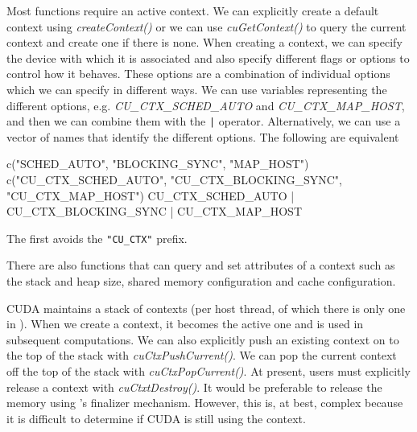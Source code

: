 \documentclass[article]{jss}
\def\R{\proglang{R}}
\def\Rpkg#1{\pkg{#1}}
\def\Rfunc#1{\textsl{#1()}}
\def\Rop#1{\texttt{#1}}
\def\Rvar#1{\textsl{#1}}
\begin{document}
Most \Rpkg{RCUDA} functions require an active context.  We can
explicitly create a default context using \Rfunc{createContext} or we
can use \Rfunc{cuGetContext} to query the current context and create
one if there is none.  When creating a context, we can specify the
device with which it is associated and also specify different flags or
options to control how it behaves.  These options are a combination of
individual options which we can specify in different ways. 
We can use \R{} variables representing the different options, e.g.
\Rvar{CU_CTX\_SCHED\_AUTO} and \Rvar{CU\_CTX\_MAP\_HOST},
and then we can combine them with the \Rop{|} operator. 
Alternatively, we can use a vector of names that identify the
different options. 
The following are equivalent
\begin{RCode}
c("SCHED_AUTO", "BLOCKING_SYNC", "MAP_HOST")
c("CU_CTX_SCHED_AUTO", "CU_CTX_BLOCKING_SYNC", "CU_CTX_MAP_HOST")
CU_CTX_SCHED_AUTO | CU_CTX_BLOCKING_SYNC | CU_CTX_MAP_HOST
\end{RCode}
The first avoids the \texttt{"CU_CTX"} prefix.

There are also functions that can query and set attributes of a
context such as the stack and heap size, shared memory configuration
and cache configuration.

 CUDA maintains a stack of contexts (per host thread, of which there
 is only one in \R).  When we create a context, it becomes the active
 one and is used in subsequent computations.  We can also explicitly
 push an existing context on to the top of the stack with
 \Rfunc{cuCtxPushCurrent}.  We can pop the current context off the top
 of the stack with \Rfunc{cuCtxPopCurrent}.  At present, \R{} users
 must explicitly release a context with \Rfunc{cuCtxtDestroy}.  It
 would be preferable to release the memory using \R's finalizer
 mechanism. However, this is, at best, complex because it is difficult
 to determine if CUDA is still using the context.
\end{document}
